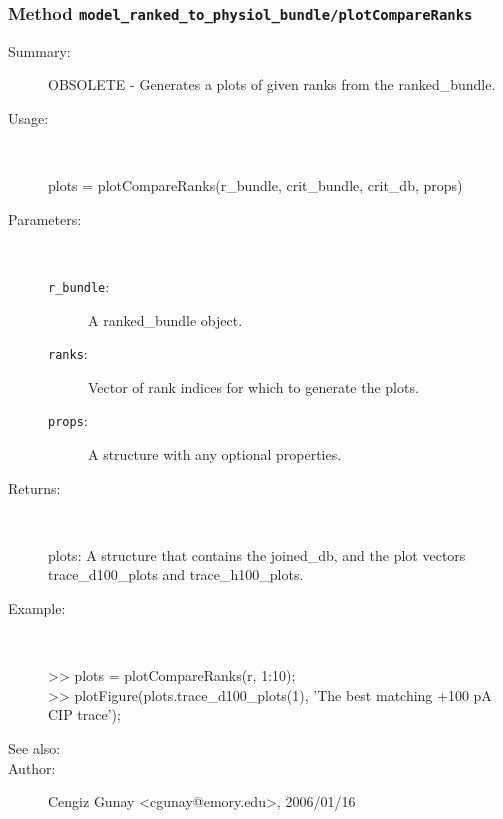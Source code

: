 \subsubsection[Method \texttt{plotCompareRanks}]{Method \texttt{model\_ranked\_to\_physiol\_bundle/plotCompareRanks}}%
%
\label{ref_model_ranked_to_physiol_bundle__plotCompareRanks}%
\hypertarget{ref_model_ranked_to_physiol_bundle__plotCompareRanks}{}%
\begin{description}
\item[Summary:]OBSOLETE - Generates a plots of given ranks from the ranked\_bundle.
%
\item[Usage:]~%
\begin{lyxcode}%
plots = plotCompareRanks(r\_bundle, crit\_bundle, crit\_db, props)
%
\end{lyxcode}%
%
%
\item[Parameters:]~
\begin{description}%
\item[\texttt{r\_bundle}:]
 A ranked\_bundle object.
\item[\texttt{ranks}:]
 Vector of rank indices for which to generate the plots.
\item[\texttt{props}:]
 A structure with any optional properties.
\end{description}%
%
\item[Returns:
]~

	plots: A structure that contains the joined\_db, and the plot vectors 
	  trace\_d100\_plots and trace\_h100\_plots.
%
\item[Example:]~
\begin{lyxcode} >> plots = plotCompareRanks(r, 1:10);
\\%
 >> plotFigure(plots.trace\_d100\_plots(1), 'The best matching +100 pA CIP trace');
\\%
\end{lyxcode}
%
\item[See also:]%
%
\item[Author:]%
Cengiz Gunay <cgunay@emory.edu>, 2006/01/16
%
\end{description}
\methodline%
